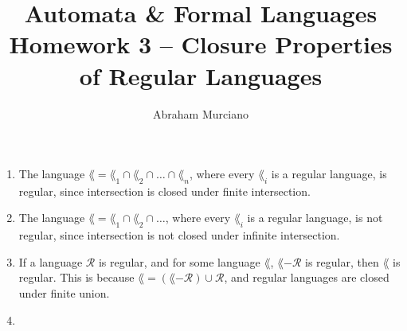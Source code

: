 \documentclass[fleqn]{article}
\title{Automata \& Formal Languages \\
\medskip
\large Homework 3 -- Closure Properties of Regular Languages}
\author{Abraham Murciano}
\begin{document}
\maketitle

\begin{answers}

	\item %
	\begin{enumerate}
		\item %
		The language \(\lang = \lang_1 \cap \lang_2 \cap \dots \cap \lang_n\), where every \(\lang_i\) is a regular language, is regular, since intersection is closed under finite intersection.

		\item %
		The language \(\lang = \lang_1 \cap \lang_2 \cap \dots\), where every \(\lang_i\) is a regular language, is not regular, since intersection is not closed under infinite intersection.

		\item %
		If a language \(\mathcal{R}\) is regular, and for some language \(\lang\), \(\lang - \mathcal{R}\) is regular, then \(\lang\) is regular. This is because \(\lang = (\lang - \mathcal{R}) \cup \mathcal{R}\), and regular languages are closed under finite union.

		\item %

	\end{enumerate}

\end{answers}
\end{document}
